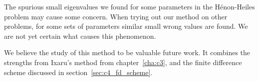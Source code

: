 The spurious small eigenvalues we found for some parameters in the Hénon-Heiles problem may cause some concern. When trying out our method on other problems, for some sets of parameters similar small wrong values are found. We are not yet certain what causes this phenomenon.

We believe the study of this method to be valuable future work. It combines the strengths from Ixaru's method from chapter~\ref{cha:c3}, and the finite difference scheme discussed in section~\ref{sec:c4_fd_scheme}.




\stopchapter
